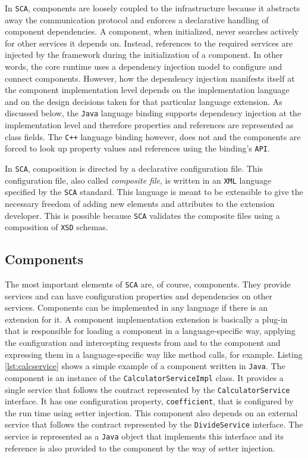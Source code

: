 In \texttt{SCA}, components are loosely coupled to the infrastructure because it abstracts away the communication protocol
and enforces a declarative handling of component dependencies. A component, when initialized, never searches
actively for other services it depends on. Instead, references to the required services are injected by the framework
during the initialization of a component. In other words, the core runtime uses a dependency injection model to
configure and connect components. However, how the dependency injection manifests itself at the component implementation
level depends on the implementation language and on the design decisions taken for that particular language extension.
As discussed below, the \texttt{Java} language binding supports dependency injection at the implementation level and therefore
properties and references are represented as class fields. The \texttt{C++} language binding however, does not and the components
are forced to look up property values and references using the binding's \texttt{API}.

In \texttt{SCA}, composition is directed by a declarative configuration file. This configuration file, also called \emph{composite file},
is written in an \texttt{XML} language specified by the \texttt{SCA} standard. This language is meant to be extensible to give the necessary
freedom of adding new elements and attributes to the extension developer. This is possible because \texttt{SCA} validates the
composite files using a composition of \texttt{XSD} schemas.

\subsection{Components}

The most important elements of \texttt{SCA} are, of course, components. They provide services and can have configuration properties
and dependencies on other services. Components can be implemented in any language if there is an extension for it. A component
implementation extension is basically a plug-in that is responsible for loading a component in a language-specific way, applying
the configuration and intercepting requests from and to the component and expressing them in a language-specific way like method
calls, for example. Listing \ref{lst:calcservice} shows a simple example of a component written in \texttt{Java}. The component is an instance
of the \texttt{CalculatorServiceImpl} class. It provides a single service that follows the contract represented by the \texttt{CalculatorService}
interface. It has one configuration property, \texttt{coefficient}, that is configured by the run time using setter injection.
This component also depends on an external service that follows the contract represented by the \texttt{DivideService} interface.
The service is represented as a \texttt{Java} object that implements this interface and its reference is also provided to the component
by the way of setter injection.

